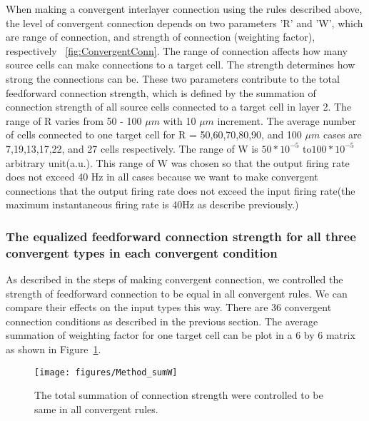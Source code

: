 When making a convergent interlayer connection using the rules described above, the level of convergent connection depends on two parameters 'R' and 'W', which are range of connection, and strength of connection (weighting factor), respectively ~\ref{fig:ConvergentConn}. The range of connection affects how many source cells can make connections to a target cell. The strength determines how strong the connections can be. These two parameters contribute to the total feedforward connection strength, which is defined by the summation of connection strength of all source cells connected to a target cell in layer 2. The range of R varies from 50 - 100 $\mu m$ with 10 $\mu m$ increment. The average number of cells connected to one target cell for R = 50,60,70,80,90, and 100 $\mu m$ cases are 7,19,13,17,22, and 27 cells respectively. The range of W is $50*10^{-5} $ to$ 100*10^{-5}$ arbitrary unit(a.u.). This range of W was chosen so that the output firing rate does not exceed 40 Hz in all cases because we want to make convergent connections that the output firing rate does not exceed the input firing rate(the maximum instantaneous firing rate is 40Hz as describe previously.) 




\subsubsection{The equalized feedforward connection strength for all three convergent types in each convergent condition}
As described in the steps of making convergent connection, we controlled the strength of feedforward connection to be equal in all convergent rules. We can compare their effects on the input types this way. There are 36 convergent connection conditions as described in the previous section. The average summation of weighting factor for one target cell can be plot in a 6 by 6 matrix as shown in Figure~\ref{fig:ConSumW}.
\begin{figure}
	\centering
	\texttt{[image: figures/Method\_sumW]}
	\caption{The total summation of connection strength were controlled to be same in all convergent rules.}
	\label{fig:ConSumW}
\end{figure}

%


